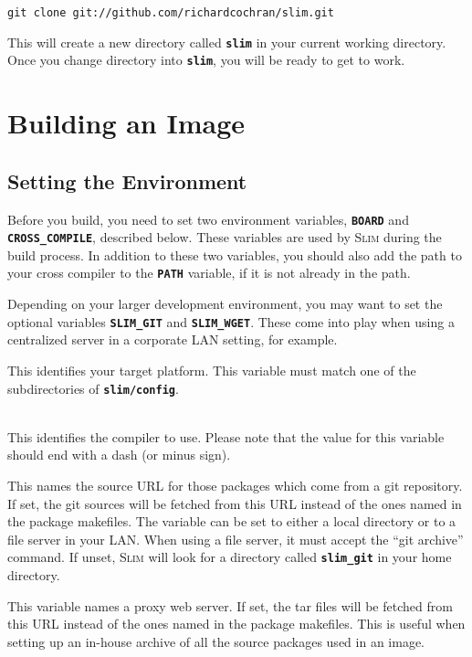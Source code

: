 \documentclass[a4paper,10pt]{article}
\newenvironment{Description}[1][\quad]{%
  \begin{list}{}{%
      \renewcommand{\makelabel}[1]{\textbf{##1}\hfill}%
      \settowidth{\labelwidth}{\textbf{#1}}%
      \setlength{\leftmargin}{\labelwidth+\labelsep}%
  }%
}{%
  \end{list}%
}
\newcommand{\slim}{\textsc{Slim}\xspace}
\newcommand{\fw}{\tt\bf}
\begin{document}
\begin{lstlisting}
git clone git://github.com/richardcochran/slim.git
\end{lstlisting}

    This will create a new directory called {\fw slim} in your current
    working directory. Once you change directory into {\fw slim}, you
    will be ready to get to work.

\section{Building an Image}

\subsection{Setting the Environment}

    Before you build, you need to set two environment variables,
    {\fw BOARD} and {\fw CROSS\_COMPILE}, described below.
    These variables are used by \slim during the build process.  In
    addition to these two variables, you should also add the path to
    your cross compiler to the {\fw PATH} variable, if it is not
    already in the path.

    Depending on your larger development environment, you may want to
    set the optional variables {\fw SLIM\_GIT} and {\fw SLIM\_WGET}.
    These come into play when using a centralized server in a
    corporate LAN setting, for example.

    \begin{Description}[SLIM\_WGETX]

    \item[BOARD]
      This identifies your target platform. This variable must match
      one of the subdirectories of {\fw slim/config}.

    \item[CROSS\_COMPILE]\mbox{}\\
      This identifies the compiler to use. Please note that the value
      for this variable should end with a dash (or minus sign).

    \item[SLIM\_GIT]
      This names the source URL for those packages which come from a
      git repository. If set, the git sources will be fetched from
      this URL instead of the ones named in the package makefiles.
      The variable can be set to either a local directory or to a file
      server in your LAN. When using a file server, it must accept the
      ``git archive'' command.  If unset, \slim will look for a
      directory called {\fw slim\_git} in your home directory.

    \item[SLIM\_WGET]
      This variable names a proxy web server. If set, the tar files
      will be fetched from this URL instead of the ones named in the
      package makefiles. This is useful when setting up an in-house
      archive of all the source packages used in an image.

    \end{Description}
\end{document}
